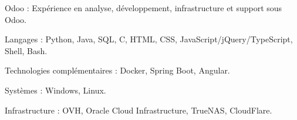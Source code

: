 \begin{indentsection}{\parindent}
  \begin{description*}
    \item[Odoo :] Expérience en analyse, développement, infrastructure et support sous Odoo.
    \item[Langages :] Python, Java, SQL, C, HTML, CSS, JavaScript/jQuery/TypeScript, Shell, Bash.
    \item[Technologies complémentaires :] Docker, Spring Boot, Angular.
    \item[Systèmes :] Windows, Linux.
    \item[Infrastructure :] OVH, Oracle Cloud Infrastructure, TrueNAS, CloudFlare.

  \end{description*}
\end{indentsection}
